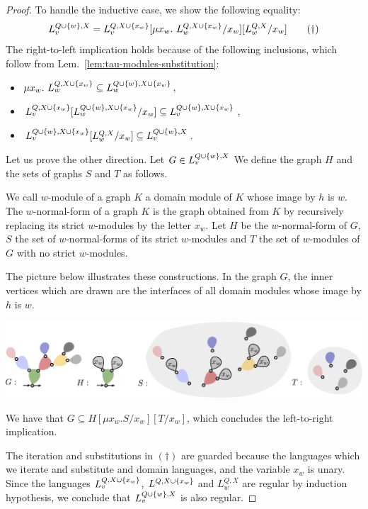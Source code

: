 \begin{proof}
 To handle the inductive case, we show the following equality:
 $$L^{Q\cup\left\{w\right\}, X}_v= L^{Q, X\cup\left\{x_w\right\}}_v[\mu x_w.\ L^{Q, X\cup\left\{x_w\right\}}_w/x_w][L^{Q, X}_w/x_w] \qquad (\dagger)$$
 The right-to-left implication holds because of the following inclusions, which follow from Lem.~\ref{lem:tau-modules-substitution}:\\[-.5pt]
 \begin{itemize}
 \item $\mu x_w.\ L^{Q, X\cup\left\{x_w\right\}}_w\subseteq L^{Q\cup\left\{w\right\}, X\cup\left\{x_w\right\}}_w$,\\[-.5pt]
 \item $L^{Q, X\cup\left\{x_w\right\}}_v[L^{Q\cup\left\{w\right\}, X\cup\left\{x_w\right\}}_w/x_w]\subseteq L^{Q\cup\left\{w\right\}, X\cup\left\{x_w\right\}}_v$,\\[-.5pt]
 \item  $L^{Q\cup\left\{w\right\}, X\cup\left\{x_w\right\}}_v[L^{Q, X}_w/x_w]\subseteq L^{Q\cup\left\{w\right\}, X}_v$.
 \end{itemize}
 
 Let us prove the other direction. Let $G\in L^{Q\cup\left\{w\right\}, X}_v$
 We define the graph $H$ and the sets of graphs $S$ and $T$ as follows. 
 
 We call $w$-module of a graph $K$ a domain module of $K$ whose image by $h$ is $w$. The $w$-normal-form of a graph $K$ is the graph obtained from $K$ by recursively replacing its strict $w$-modules by the letter $x_w$.  
 Let $H$ be the $w$-normal-form of $G$, $S$ the set of $w$-normal-forms of its strict $w$-modules and $T$ the set of $w$-modules of $G$ with no strict $w$-modules.
 
 
 The picture below illustrates these constructions. In the graph $G$, the inner vertices which are drawn are the interfaces of all domain modules whose image by $h$ is $w$. 
 \begin{center}
 \includegraphics[scale=.3]{Pictures/proof-rec->reg-dom}
\end{center}
We have that $G\subseteq H[\mu x_w. S/x_w][T/x_w]$, which concludes the left-to-right implication.
\medskip

The iteration and substitutions in $(\dagger)$ are guarded because the languages which we iterate and substitute and domain languages, and the variable $x_w$ is unary. Since the languages $L^{Q, X\cup\left\{x_w\right\}}_v$, $L^{Q, X\cup\left\{x_w\right\}}$ and $L^{Q, X}_w$ are regular by induction hypothesis, we conclude that $L^{Q\cup\left\{w\right\}, X}_v$ is also regular. 
\end{proof}

